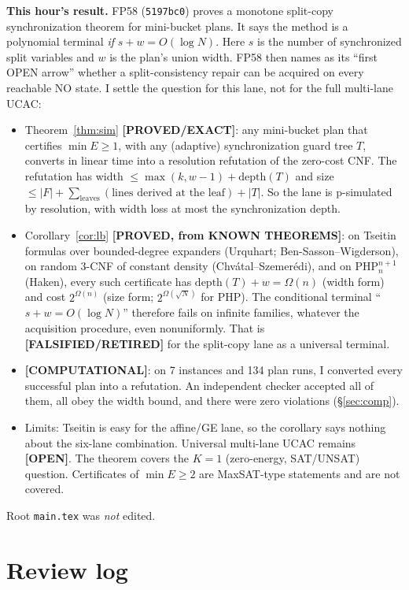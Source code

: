 \documentclass[11pt]{article}
\theoremstyle{definition}
\theoremstyle{remark}
\newcommand{\lab}[1]{\textbf{[#1]}}
\begin{document}
\textbf{This hour's result.} FP58 (\texttt{5197bc0}) proves a monotone split-copy
synchronization theorem for mini-bucket plans. It says the method is a polynomial terminal
\emph{if} $s+w=O(\log N)$. Here $s$ is the number of synchronized split variables and $w$ is
the plan's union width. FP58 then names as its ``first OPEN arrow'' whether a split-consistency
repair can be acquired on every reachable NO state. I settle the question for this lane, not
for the full multi-lane UCAC:
\begin{itemize}
\item Theorem~\ref{thm:sim} \lab{PROVED/EXACT}: any mini-bucket plan that certifies
$\min E\ge1$, with any (adaptive) synchronization guard tree $T$, converts in linear time into
a resolution refutation of the zero-cost CNF. The refutation has width
$\le\max(k,w-1)+\mathrm{depth}(T)$ and size $\le|F|+\sum_{\text{leaves}}(\text{lines derived at the leaf})+|T|$.
So the lane is p-simulated by resolution, with width loss at most the synchronization depth.
\item Corollary~\ref{cor:lb} \lab{PROVED, from KNOWN THEOREMS}: on Tseitin formulas over
bounded-degree expanders (Urquhart; Ben-Sasson--Wigderson), on random 3-CNF of constant
density (Chv\'atal--Szemer\'edi), and on PHP$^{n+1}_n$ (Haken), every such certificate has
$\mathrm{depth}(T)+w=\Omega(n)$ (width form) and cost $2^{\Omega(n)}$ (size form; $2^{\Omega(\sqrt N)}$ for PHP). The
conditional terminal ``$s+w=O(\log N)$'' therefore fails on infinite families, whatever the
acquisition procedure, even nonuniformly. That is \lab{FALSIFIED/RETIRED} for the split-copy
lane as a universal terminal.
\item \lab{COMPUTATIONAL}: on 7 instances and 134 plan runs, I converted every successful plan
into a refutation. An independent checker accepted all of them, all obey the width bound, and
there were zero violations (\S\ref{sec:comp}).
\item Limits: Tseitin is easy for the affine/GE lane, so the corollary says nothing about the
six-lane combination. Universal multi-lane UCAC remains \lab{OPEN}. The theorem covers the
$K=1$ (zero-energy, SAT/UNSAT) question. Certificates of $\min E\ge2$ are MaxSAT-type
statements and are not covered.
\end{itemize}
Root \texttt{main.tex} was \emph{not} edited.

\section{Review log}
\end{document}
